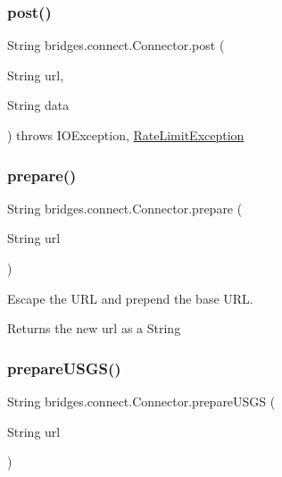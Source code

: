 \subsubsection{\texorpdfstring{post()}{post()}\hspace{0.1cm}{\footnotesize\ttfamily [2/2]}}
{\footnotesize\ttfamily String bridges.\+connect.\+Connector.\+post (\begin{DoxyParamCaption}\item[{String}]{url,  }\item[{String}]{data }\end{DoxyParamCaption}) throws I\+O\+Exception, 		\mbox{\hyperlink{classbridges_1_1validation_1_1_rate_limit_exception}{Rate\+Limit\+Exception}}}

\mbox{\label{classbridges_1_1connect_1_1_connector_a507ee5a9d8c812ffd4629cbd22f27373}} 
\subsubsection{\texorpdfstring{prepare()}{prepare()}}
{\footnotesize\ttfamily String bridges.\+connect.\+Connector.\+prepare (\begin{DoxyParamCaption}\item[{String}]{url }\end{DoxyParamCaption})}

Escape the U\+RL and prepend the base U\+RL. \begin{DoxyReturn}{Returns}
the new url as a String 
\end{DoxyReturn}
\mbox{\label{classbridges_1_1connect_1_1_connector_aa0201e2569358ff906d3c14d654711e5}} 
\subsubsection{\texorpdfstring{prepare\+U\+S\+G\+S()}{prepareUSGS()}}
{\footnotesize\ttfamily String bridges.\+connect.\+Connector.\+prepare\+U\+S\+GS (\begin{DoxyParamCaption}\item[{String}]{url }\end{DoxyParamCaption})}

